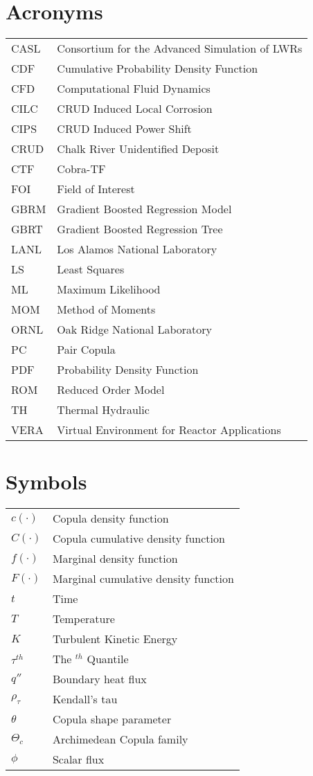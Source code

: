 
\section*{Acronyms}
\begin{tabular}{l l}
CASL & Consortium for the Advanced Simulation of LWRs \\
CDF  & Cumulative Probability Density Function \\
CFD &  Computational Fluid Dynamics \\
CILC & CRUD Induced Local Corrosion \\
CIPS & CRUD Induced Power Shift \\
CRUD & Chalk River Unidentified Deposit \\
CTF &  Cobra-TF \\
FOI &  Field of Interest \\
GBRM & Gradient Boosted Regression Model \\
GBRT & Gradient Boosted Regression Tree \\
LANL & Los Alamos National Laboratory \\
LS  &  Least Squares \\
ML  &  Maximum Likelihood \\
MOM &  Method of Moments \\
ORNL & Oak Ridge National Laboratory \\
PC  &  Pair Copula \\
PDF  &  Probability Density Function \\
ROM &  Reduced Order Model \\
TH  &  Thermal Hydraulic \\
VERA & Virtual Environment for Reactor Applications \\
\end{tabular}

\section*{Symbols}
\begin{tabular}{l l}
$c(\cdot)$ & Copula density function \\
$C(\cdot)$ & Copula cumulative density function \\
$f(\cdot)$ & Marginal density function \\
$F(\cdot)$ & Marginal cumulative density function \\
$t$ & Time \\
$T$ & Temperature \\
$K$ & Turbulent Kinetic Energy \\
$\tau^{th}$ & The $^{th}$ Quantile \\
$q''$ & Boundary heat flux \\
$\rho_{\tau}$ & Kendall's tau \\
$\theta$ & Copula shape parameter \\
$\Theta_c$ & Archimedean Copula family \\
$\phi$ & Scalar flux \\
\end{tabular}

\pagebreak
